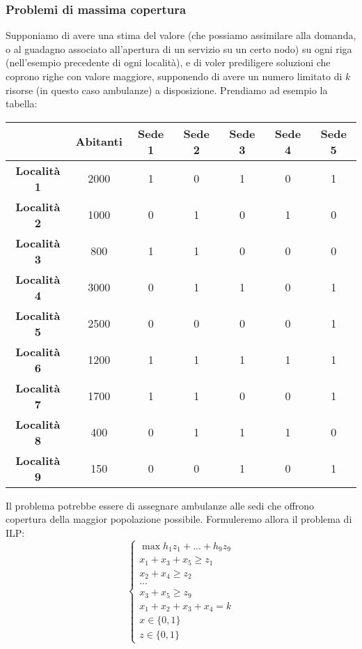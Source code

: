 \documentclass[a4paper,11pt]{article}
\begin{document}
\subsubsection{Problemi di massima copertura}
Supponiamo di avere una stima del valore (che possiamo assimilare alla domanda, o al guadagno associato all'apertura di un servizio su un certo nodo) su ogni riga (nell'esempio precedente di ogni località), e di voler prediligere soluzioni che coprono righe con valore maggiore, supponendo di avere un numero limitato di $k$ risorse (in questo caso ambulanze) a disposizione.
Prendiamo ad esempio la tabella:

\begin{table}[h!]
	\center {}
	\begin{tabular} {  c || c || c | c | c | c | c  }
		& \bfseries Abitanti & \bfseries Sede 1 & \bfseries Sede 2 & \bfseries Sede 3 & \bfseries Sede 4 & \bfseries Sede 5\\
		\hline 
		\bfseries Località 1 & 2000 & 1 & 0 & 1 & 0 & 1 \\
		\bfseries Località 2 & 1000 & 0 & 1 & 0 & 1 & 0 \\
		\bfseries Località 3 & 800 & 1 & 1 & 0 & 0 & 0 \\
		\bfseries Località 4 & 3000 & 0 & 1 & 1 & 0 & 1 \\
		\bfseries Località 5 & 2500 & 0 & 0 & 0 & 0 & 1 \\
		\bfseries Località 6 & 1200 & 1 & 1 & 1 & 1 & 1 \\
		\bfseries Località 7 & 1700 & 1 & 1 & 0 & 0 & 1 \\
		\bfseries Località 8 & 400 & 0 & 1 & 1 & 1 & 0 \\
		\bfseries Località 9 & 150 & 0 & 0 & 1 & 0 & 1 \\
	\end{tabular}	
\end{table}

Il problema potrebbe essere di assegnare ambulanze alle sedi che offrono copertura della maggior popolazione possibile. 
Formuleremo allora il problema di ILP:
\[
	\begin{cases}
		\max h_1 z_1 + ... + h_9 z_9 \\
		x_1 + x_3 + x_5 \geq z_1 \\
		x_2 + x_4 \geq z_2 \\ 
		... \\ 
		x_3 + x_5 \geq z_9 \\
		x_1 + x_2 + x_3 + x_4 = k \\ 
		x \in \{ 0, 1 \} \\ 
		z \in \{ 0, 1 \}
	\end{cases}
\] 
\end{document}
